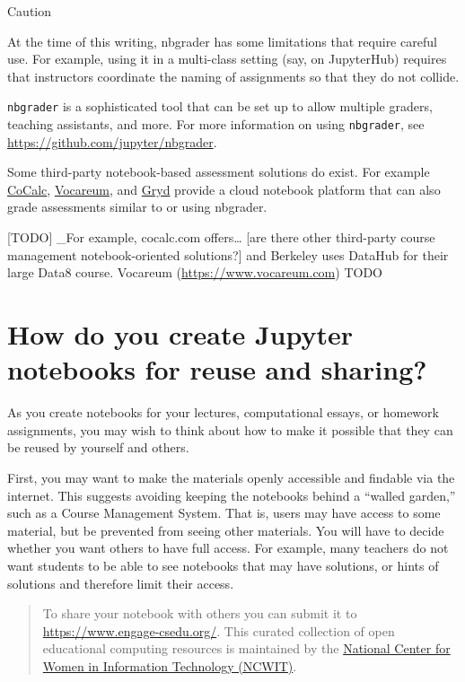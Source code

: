 \documentclass[]{book}
\let\BeginKnitrBlock\begin \let\EndKnitrBlock\end
\begin{document}
\BeginKnitrBlock{rmdnote}
Caution

At the time of this writing, nbgrader has some limitations that require
careful use. For example, using it in a multi-class setting (say, on
JupyterHub) requires that instructors coordinate the naming of
assignments so that they do not collide.
\EndKnitrBlock{rmdnote}

\texttt{nbgrader} is a sophisticated tool that can be set up to allow
multiple graders, teaching assistants, and more. For more information on
using \texttt{nbgrader}, see \url{https://github.com/jupyter/nbgrader}.

Some third-party notebook-based assessment solutions do exist. For
example \href{www.cocalc.com}{CoCalc},
\href{www.vocareum.com}{Vocareum}, and \href{https://gryd.us}{Gryd}
provide a cloud notebook platform that can also grade assessments
similar to or using nbgrader.

{[}TODO{]} \_For example, cocalc.com offers\ldots{} {[}are there other
third-party course management notebook-oriented solutions?{]} and
Berkeley uses DataHub for their large Data8 course. Vocareum
(\url{https://www.vocareum.com}) TODO

\section{How do you create Jupyter notebooks for reuse and
sharing?}\label{how-do-you-create-jupyter-notebooks-for-reuse-and-sharing}

As you create notebooks for your lectures, computational essays, or
homework assignments, you may wish to think about how to make it
possible that they can be reused by yourself and others.

First, you may want to make the materials openly accessible and findable
via the internet. This suggests avoiding keeping the notebooks behind a
``walled garden,'' such as a Course Management System. That is, users
may have access to some material, but be prevented from seeing other
materials. You will have to decide whether you want others to have full
access. For example, many teachers do not want students to be able to
see notebooks that may have solutions, or hints of solutions and
therefore limit their access.

\begin{quote}
To share your notebook with others you can submit it to
\url{https://www.engage-csedu.org/}. This curated collection of open
educational computing resources is maintained by the
\href{https://www.ncwit.org/}{National Center for Women in Information
Technology (NCWIT)}.
\end{quote}
\end{document}
